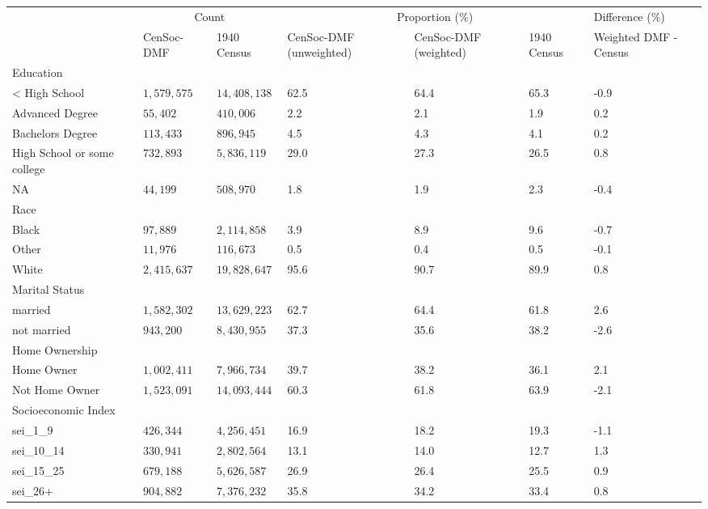 \captionsetup[table]{labelformat=empty,skip=1pt}
\begin{longtable}{lllllll}
\toprule
 & \multicolumn{2}{c}{Count} & \multicolumn{3}{c}{Proportion (\%)} & Difference (\%) \\ 
 \cmidrule(lr){2-3} \cmidrule(lr){4-6} \cmidrule(lr){7-7}
 & CenSoc-DMF & 1940 Census & CenSoc-DMF (unweighted) & CenSoc-DMF (weighted) & 1940 Census & Weighted DMF - Census \\ 
\midrule
\multicolumn{1}{l}{Education} \\ 
\midrule
< High School & $1,579,575$ & $14,408,138$ & 62.5 & 64.4 & 65.3 & -0.9 \\ 
Advanced Degree & $55,402$ & $410,006$ & 2.2 & 2.1 & 1.9 & 0.2 \\ 
Bachelors Degree & $113,433$ & $896,945$ & 4.5 & 4.3 & 4.1 & 0.2 \\ 
High School or some college & $732,893$ & $5,836,119$ & 29.0 & 27.3 & 26.5 & 0.8 \\ 
NA & $44,199$ & $508,970$ & 1.8 & 1.9 & 2.3 & -0.4 \\ 
\midrule
\multicolumn{1}{l}{Race} \\ 
\midrule
Black & $97,889$ & $2,114,858$ & 3.9 & 8.9 & 9.6 & -0.7 \\ 
Other & $11,976$ & $116,673$ & 0.5 & 0.4 & 0.5 & -0.1 \\ 
White & $2,415,637$ & $19,828,647$ & 95.6 & 90.7 & 89.9 & 0.8 \\ 
\midrule
\multicolumn{1}{l}{Marital Status} \\ 
\midrule
married & $1,582,302$ & $13,629,223$ & 62.7 & 64.4 & 61.8 & 2.6 \\ 
not married & $943,200$ & $8,430,955$ & 37.3 & 35.6 & 38.2 & -2.6 \\ 
\midrule
\multicolumn{1}{l}{Home Ownership} \\ 
\midrule
Home Owner & $1,002,411$ & $7,966,734$ & 39.7 & 38.2 & 36.1 & 2.1 \\ 
Not Home Owner & $1,523,091$ & $14,093,444$ & 60.3 & 61.8 & 63.9 & -2.1 \\ 
\midrule
\multicolumn{1}{l}{Socioeconomic Index} \\ 
\midrule
sei\_1\_9 & $426,344$ & $4,256,451$ & 16.9 & 18.2 & 19.3 & -1.1 \\ 
sei\_10\_14 & $330,941$ & $2,802,564$ & 13.1 & 14.0 & 12.7 & 1.3 \\ 
sei\_15\_25 & $679,188$ & $5,626,587$ & 26.9 & 26.4 & 25.5 & 0.9 \\ 
sei\_26+ & $904,882$ & $7,376,232$ & 35.8 & 34.2 & 33.4 & 0.8 \\ 

\end{longtable}
